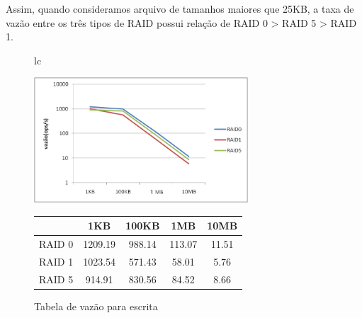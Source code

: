 	Assim, quando consideramos arquivo de tamanhos maiores que 25KB, a taxa de vazão entre os três tipos de RAID possui relação de RAID 0 > RAID 5 > RAID 1.
	\\
	
	\begin{figure}[h]
		\begin{tabular}{lc}
			\begin{minipage}{.50\textwidth}
				\begin{center}
					
					\includegraphics[clip,width=8.0cm]{images/resultados/throughput_escrita.png}
					\caption{Gráfico de vazão para escrita}
					\label{fig:throughput_e}
					
				\end{center}
				
			\end{minipage}
			
			\begin{minipage}{.5\textwidth}
				\makeatletter
				\def\@captype{table}
				\makeatother
				\caption{Tabela de vazão para escrita}
				\label{tab:throughput_e}
				\begin{center}
					\begin{tabular}{|c|c|c|c|c|} \hline
						& 1KB & 100KB & 1MB & 10MB \\ \hline
						
						RAID 0	& 1209.19 & 988.14 & 113.07 & 11.51\\ \hline
						RAID 1	& 1023.54 & 571.43 & 58.01  & 5.76 \\ \hline
						RAID 5	& 914.91  & 830.56 & 84.52  & 8.66 \\ \hline
						
						
					\end{tabular}
				\end{center}
				
			\end{minipage}
		\end{tabular}
	\end{figure}
	
